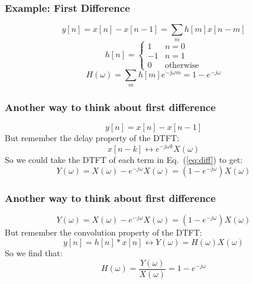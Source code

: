 \begin{frame}
  \frametitle{Example: First Difference}

  \begin{displaymath}
    y[n] = x[n]-x[n-1] = \sum_m h[m] x[n-m]
  \end{displaymath}
  \begin{displaymath}
    h[n] =\begin{cases}
    1 & n=0\\
    -1 & n=1\\
    0&\mbox{otherwise}
    \end{cases}
  \end{displaymath}
  \begin{displaymath}
    H(\omega) = \sum_m h[m]e^{-j\omega m} = 1-e^{-j\omega}
  \end{displaymath}
\end{frame}

\begin{frame}
  \frametitle{Another way to think about first difference}

  \begin{equation}
    y[n] = x[n]-x[n-1]
    \label{eq:diff}
  \end{equation}
  But remember the delay property of the DTFT:
  \begin{displaymath}
    x[n-k] \leftrightarrow e^{-j\omega k}X(\omega)
  \end{displaymath}
  So we could take the DTFT of each term in Eq.~(\ref{eq:diff}) to
  get:
  \begin{displaymath}
    Y(\omega) = X(\omega) - e^{-j\omega}X(\omega) = \left(1-e^{-j\omega}\right)X(\omega)
  \end{displaymath}
\end{frame}

\begin{frame}
  \frametitle{Another way to think about first difference}

  \begin{displaymath}
    Y(\omega) = X(\omega) - e^{-j\omega}X(\omega) = \left(1-e^{-j\omega}\right)X(\omega)
  \end{displaymath}
  But remember the convolution property of the DTFT:
  \begin{displaymath}
    y[n]=h[n]\ast x[n] \leftrightarrow Y(\omega) = H(\omega)X(\omega)
  \end{displaymath}
  So we find that:
  \begin{displaymath}
    H(\omega)=\frac{Y(\omega)}{X(\omega)} = 1-e^{-j\omega}
  \end{displaymath}
\end{frame}

